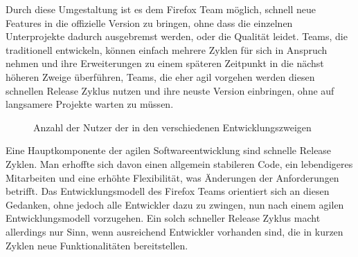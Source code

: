 Durch diese Umgestaltung ist es dem Firefox Team möglich, schnell neue Features in die offizielle Version zu bringen, ohne dass die einzelnen Unterprojekte dadurch ausgebremst werden, oder die Qualität leidet. Teams, die traditionell entwickeln, können einfach mehrere Zyklen für sich in Anspruch nehmen und ihre Erweiterungen zu einem späteren Zeitpunkt in die nächst höheren Zweige überführen, Teams, die eher agil vorgehen werden diesen schnellen Release Zyklus nutzen und ihre neuste Version einbringen, ohne auf langsamere Projekte warten zu müssen.

\begin{figure}[h]
	\centering
	\caption{Anzahl der Nutzer der in den verschiedenen Entwicklungszweigen\cite{bib:fire-development}}
	\label{fireusers}
\end{figure}

Eine Hauptkomponente der agilen Softwareentwicklung sind schnelle Release Zyklen. Man erhoffte sich davon einen allgemein stabileren Code, ein lebendigeres Mitarbeiten und eine erhöhte Flexibilität, was Änderungen der Anforderungen betrifft. Das Entwicklungsmodell des Firefox Teams orientiert sich an diesen Gedanken, ohne jedoch alle Entwickler dazu zu zwingen, nun nach einem agilen Entwicklungsmodell vorzugehen. Ein solch schneller Release Zyklus macht allerdings nur Sinn, wenn ausreichend Entwickler vorhanden sind, die in kurzen Zyklen neue Funktionalitäten bereitstellen.

